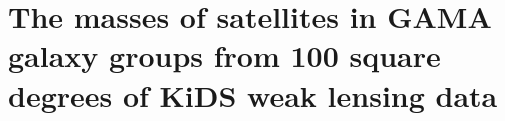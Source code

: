 % 
% 
% 
% 
% 
% 

\chapter[Satellite galaxy-galaxy lensing in KiDS$\times$GAMA]{The masses of satellites in 
GAMA galaxy groups from 100 square degrees of KiDS weak lensing data}

